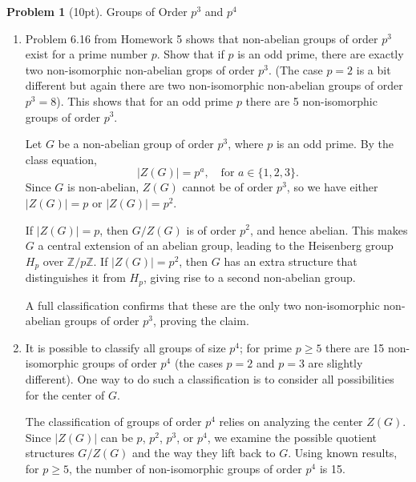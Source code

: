\documentclass[12pt]{article}
\theoremstyle{definition}
\newtheorem{problem}{Problem}
\begin{document}
\begin{problem}[10pt] Groups of Order $p^3$ and $p^4$
    \begin{enumerate}[label=\arabic*.]
        \item Problem 6.16 from Homework 5 shows that non-abelian groups of order
              $p^3$ exist for a prime number $p$. Show that if $p$ is an odd prime,
              there are exactly two non-isomorphic non-abelian grops of order $p^3$.
              (The case $p = 2$ is a bit different but again there are two non-isomorphic
              non-abelian groups of order $p^3 = 8$). This shows that for an odd prime $p$
              there are 5 non-isomorphic groups of order $p^3$.

        \begin{solution}
            Let $G$ be a non-abelian group of order $p^3$, where $p$ is an odd prime. By the class equation,
            \[
                  |Z(G)| = p^a, \quad \text{for } a \in \{1,2,3\}.
            \]
            Since $G$ is non-abelian, $Z(G)$ cannot be of order $p^3$, so we have either $|Z(G)| = p$ or $|Z(G)| = p^2$.
            
            If $|Z(G)| = p$, then $G/Z(G)$ is of order $p^2$, and hence abelian. This makes $G$ a central extension of an 
            abelian group, leading to the Heisenberg group $H_p$ over $\mathbb{Z}/p\mathbb{Z}$. If $|Z(G)| = p^2$, then $G$ 
            has an extra structure that distinguishes it from $H_p$, giving rise to a second non-abelian group.
            
            A full classification confirms that these are the only two non-isomorphic non-abelian groups of order $p^3$, proving the claim.
            
        \end{solution}

        \item It is possible to classify all groups of size $p^4$; for prime $p \geq 5$ there
              are 15 non-isomorphic groups of order $p^4$ (the cases $p = 2$ and $p = 3$ are slightly
              different). One way to do such a classification is to consider all possibilities for 
              the center of $G$.

        \begin{solution}
            The classification of groups of order $p^4$ relies on analyzing the center $Z(G)$. 
            Since $|Z(G)|$ can be $p$, $p^2$, $p^3$, or $p^4$, we examine the possible quotient 
            structures $G/Z(G)$ and the way they lift back to $G$. Using known results, for 
            $p \geq 5$, the number of non-isomorphic groups of order $p^4$ is 15.
        \end{solution}


\end{enumerate}
\end{problem}
\end{document}
